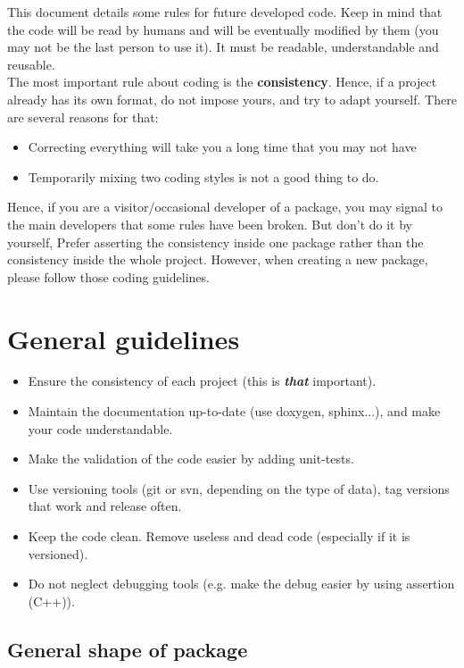 This document details some rules for future developed code.
Keep in mind that the code will be read by humans and will be eventually modified by them (you may not be the last person to use it). 
It must be readable, understandable and reusable.\\

The most important rule about coding is the \textbf{consistency}.
Hence, if a project already has its own format, do not impose yours, and try to adapt yourself.
There are several reasons for that:
\begin{itemize}
\item Correcting everything will take you a long time that you may not have
\item Temporarily mixing two coding styles is not a good thing to do.
\end{itemize}
Hence, if you are a visitor/occasional developer of a package, you may signal to the main developers that some rules have been broken. But don't do it by yourself, 
Prefer asserting the consistency inside one package rather than the consistency inside the whole project.
However, when creating a new package, please follow those coding guidelines.

\chapter{General guidelines}
\label{section:general-guidelines}
\begin{itemize}[noitemsep,topsep=0pt,parsep=0pt,partopsep=0pt]
\item Ensure the consistency of each project (this is \textbf{\textit{that}} important).
\item Maintain the documentation up-to-date (use doxygen, sphinx...), and make your code understandable.
\item Make the validation of the code easier by adding unit-tests.
\item Use versioning tools (git or svn, depending on the type of data), tag versions that work and release often.
\item Keep the code clean. Remove useless and dead code (especially if it is versioned).
\item Do not neglect debugging tools (e.g. make the debug easier by using assertion (C++)).
\end{itemize}

\section{General shape of package}

